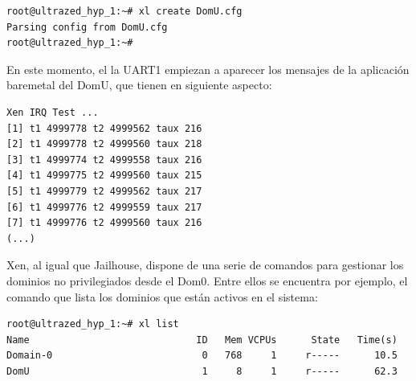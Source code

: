 \begin{lstlisting}[style=CStyle]
root@ultrazed_hyp_1:~# xl create DomU.cfg
Parsing config from DomU.cfg
root@ultrazed_hyp_1:~#
\end{lstlisting}

En este momento, el la \acrshort{UART}1 empiezan a aparecer los mensajes de la aplicación baremetal del DomU, que tienen en siguiente aspecto:

\begin{lstlisting}[style=CStyle]
Xen IRQ Test ...
[1] t1 4999778 t2 4999562 taux 216
[2] t1 4999778 t2 4999560 taux 218
[3] t1 4999774 t2 4999558 taux 216
[4] t1 4999775 t2 4999560 taux 215
[5] t1 4999779 t2 4999562 taux 217
[6] t1 4999776 t2 4999559 taux 217
[7] t1 4999776 t2 4999560 taux 216
(...)
\end{lstlisting}

Xen, al igual que Jailhouse, dispone de una serie de comandos para gestionar los dominios no privilegiados desde el Dom0. Entre ellos se encuentra por ejemplo, el comando que lista los dominios que están activos en el sistema:

\begin{lstlisting}[style=CStyle]
root@ultrazed_hyp_1:~# xl list
Name                             ID   Mem VCPUs      State   Time(s)
Domain-0                          0   768     1     r-----      10.5
DomU                              1     8     1     r-----      62.3
\end{lstlisting}
